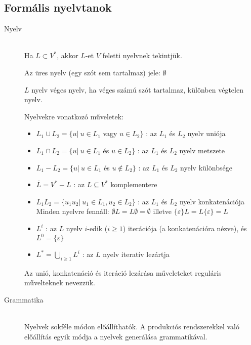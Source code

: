 \documentclass[margin=0px]{article}
\begin{document}
\subsection{Formális nyelvtanok}
\begin{description}
    \item[Nyelv] \hfill \\
        Ha $L \subset V^*$, akkor $L$-et $V$ feletti nyelvnek tekintjük.

        Az üres nyelv (egy szót sem tartalmaz) jele: $\emptyset$

        $L$ nyelv véges nyelv, ha véges számú szót tartalmaz, különben végtelen nyelv.

        Nyelvekre vonatkozó műveletek:
        \begin{itemize}
            \item $ L_1 \cup L_2 = \{u | \ u \in L_1 $ vagy $ u \in L_2\}$ : az $L_1$ és $L_2$ nyelv uniója
            \item $ L_1 \cap L_2 = \{u | \ u \in L_1 $ és $ u \in L_2\}$ : az $L_1$ és $L_2$ nyelv metszete
            \item $ L_1 - L_2 = \{u | \ u \in L_1 $ és $ u \notin L_2\}$ : az $L_1$ és $L_2$ nyelv különbsége
            \item $\overline{L} = V^* - L$ : az $L \subseteq V^*$ komplementere
            \item $L_1L_2 = \{u_1u_2 | \ u_1 \in L_1, u_2 \in L_2\}$ : az $L_1$ és $L_2$ nyelv konkatenációja\\
                  Minden nyelvre fennáll: $\emptyset L = L \emptyset = \emptyset$ illetve $\{\varepsilon\}L = L\{\varepsilon\} = L$
            \item $L^i$ : az $L$ nyelv $i$-edik ($i \geq 1$) iterációja (a konkatenációra nézve), és $L^0 = \{\varepsilon\}$
            \item $ L^* = \bigcup\limits_{i\geq1} L^i$ : az $L$ nyelv iteratív lezártja
        \end{itemize}
        Az unió, konkatenáció és iteráció lezárása műveleteket reguláris művelteknek nevezzük.
    \item[Grammatika] \hfill \\
        Nyelvek sokféle módon előállíthatók. A produkciós rendszerekkel való előállítás egyik módja a nyelvek generálása grammatikával.


\end{description}
\end{document}

